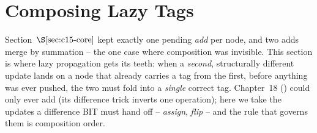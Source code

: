 \section{Composing Lazy Tags}\label{sec:c15-compose}

\begin{previouslybox}
Section~\(\secref{c15-core}\) kept exactly one pending \emph{add} per node, and two adds merge by summation -- the one case where composition was invisible.  This section is where lazy propagation gets its teeth: when a \emph{second}, structurally different update lands on a node that already carries a tag from the first, before anything was ever pushed, the two must fold into a \emph{single} correct tag.  Chapter~18 () could only ever add (its difference trick inverts one operation); here we take the updates a difference BIT must hand off -- \emph{assign}, \emph{flip} -- and the rule that governs them is composition order.
\end{previouslybox}

